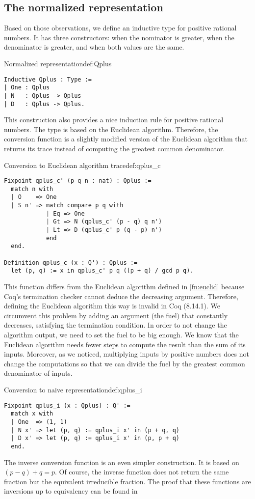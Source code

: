 \subsection{The normalized representation}
Based on those observations, we define an inductive type for positive rational numbers. It has three constructors:  when the nominator is greater,  when the denominator is greater, and  when both values are the same.
\begin{defi}{Normalized representation}{def:Qplus}
\begin{verbatim}
Inductive Qplus : Type :=
| One : Qplus
| N   : Qplus -> Qplus
| D   : Qplus -> Qplus.
\end{verbatim}
\end{defi}
This construction also provides a nice induction rule for positive rational numbers. The type  is based on the Euclidean algorithm. Therefore, the conversion function is a slightly modified version of the Euclidean algorithm that returns its trace instead of computing the greatest common denominator. 
\begin{func}{Conversion to Euclidean algorithm trace}{def:qplus_c}
\begin{verbatim}
Fixpoint qplus_c' (p q n : nat) : Qplus :=
  match n with
  | O    => One
  | S n' => match compare p q with
            | Eq => One
            | Gt => N (qplus_c' (p - q) q n')
            | Lt => D (qplus_c' p (q - p) n')
            end
  end.

Definition qplus_c (x : Q') : Qplus :=
  let (p, q) := x in qplus_c' p q ((p + q) / gcd p q).
\end{verbatim}
\end{func}
This function differs from the Euclidean algorithm defined in \ref{fn:euclid} because Coq's termination checker cannot deduce the decreasing argument. Therefore, defining the Euclidean algorithm this way is invalid in Coq (8.14.1). We circumvent this problem by adding an argument (the fuel) that constantly decreases, satisfying the termination condition. In order to not change the algorithm output, we need to set the fuel to be big enough. We know that the Euclidean algorithm needs fewer steps to compute the result than the sum of its inputs. Moreover, as we noticed, multiplying inputs by positive numbers does not change the computations so that we can divide the fuel by the greatest common denominator of inputs.
\begin{func}{Conversion to naive representation}{def:qplus_i}
\begin{verbatim}
Fixpoint qplus_i (x : Qplus) : Q' :=
  match x with
  | One  => (1, 1)
  | N x' => let (p, q) := qplus_i x' in (p + q, q)
  | D x' => let (p, q) := qplus_i x' in (p, p + q)
  end.
\end{verbatim}
\end{func}
The inverse conversion function is an even simpler construction. It is based on $(p - q) + q = p$. Of course, the inverse function does not return the same fraction but the equivalent irreducible fraction. The proof that these functions are inversions up to equivalency can be found in 
